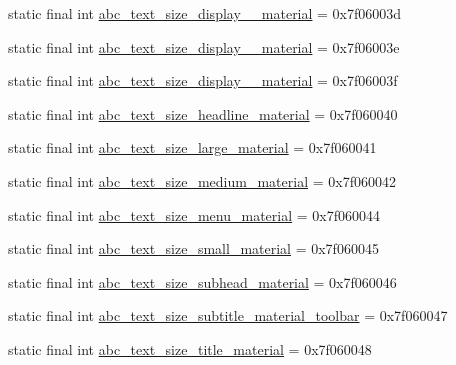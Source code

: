 \begin{DoxyCompactItemize}
\item 
static final int \mbox{\hyperlink{classcom_1_1google_1_1android_1_1gms_1_1R_1_1dimen_a45518bee90c36104abe7ccb6dae51948}{abc\+\_\+text\+\_\+size\+\_\+display\+\_\+\_\+material}} = 0x7f06003d
\item 
static final int \mbox{\hyperlink{classcom_1_1google_1_1android_1_1gms_1_1R_1_1dimen_aa60d257fd60db9de2747234292de7268}{abc\+\_\+text\+\_\+size\+\_\+display\+\_\+\_\+material}} = 0x7f06003e
\item 
static final int \mbox{\hyperlink{classcom_1_1google_1_1android_1_1gms_1_1R_1_1dimen_a29ad113519826a5983ebef1ba99d5f79}{abc\+\_\+text\+\_\+size\+\_\+display\+\_\+\_\+material}} = 0x7f06003f
\item 
static final int \mbox{\hyperlink{classcom_1_1google_1_1android_1_1gms_1_1R_1_1dimen_ab42cfdec449fb6ade43a521f9528e288}{abc\+\_\+text\+\_\+size\+\_\+headline\+\_\+material}} = 0x7f060040
\item 
static final int \mbox{\hyperlink{classcom_1_1google_1_1android_1_1gms_1_1R_1_1dimen_a140e6736e31e0d9d96189b9a3c71a39a}{abc\+\_\+text\+\_\+size\+\_\+large\+\_\+material}} = 0x7f060041
\item 
static final int \mbox{\hyperlink{classcom_1_1google_1_1android_1_1gms_1_1R_1_1dimen_af5200324ab96b8550ea627cb1243d6e7}{abc\+\_\+text\+\_\+size\+\_\+medium\+\_\+material}} = 0x7f060042
\item 
static final int \mbox{\hyperlink{classcom_1_1google_1_1android_1_1gms_1_1R_1_1dimen_a1be605a9cbd61e0889f0f84ba0ad20db}{abc\+\_\+text\+\_\+size\+\_\+menu\+\_\+material}} = 0x7f060044
\item 
static final int \mbox{\hyperlink{classcom_1_1google_1_1android_1_1gms_1_1R_1_1dimen_a5b7adbd6bee3891ef4ad28a83ff93838}{abc\+\_\+text\+\_\+size\+\_\+small\+\_\+material}} = 0x7f060045
\item 
static final int \mbox{\hyperlink{classcom_1_1google_1_1android_1_1gms_1_1R_1_1dimen_a4d7899cb7fd1c8d8f7e17791d595b76d}{abc\+\_\+text\+\_\+size\+\_\+subhead\+\_\+material}} = 0x7f060046
\item 
static final int \mbox{\hyperlink{classcom_1_1google_1_1android_1_1gms_1_1R_1_1dimen_af7ba12f6f8b3e772ab309ac2946a49a6}{abc\+\_\+text\+\_\+size\+\_\+subtitle\+\_\+material\+\_\+toolbar}} = 0x7f060047
\item 
static final int \mbox{\hyperlink{classcom_1_1google_1_1android_1_1gms_1_1R_1_1dimen_a4f33bbbd8fba2bb356b6ccc5790e7078}{abc\+\_\+text\+\_\+size\+\_\+title\+\_\+material}} = 0x7f060048
\item 

\end{DoxyCompactItemize}
